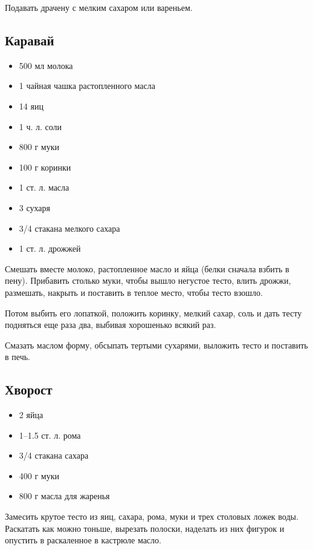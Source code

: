 Подавать драчену с мелким сахаром или вареньем.

\subsection{Каравай}

\begin{itemize}
	\item 500 мл молока 
    \item 1 чайная чашка растопленного масла
    \item 14 яиц 
    \item 1 ч. л. соли 
    \item 800 г муки 
    \item 100 г коринки
    \item 1 ст. л. масла 
    \item 3 сухаря
    \item 3/4 стакана мелкого сахара
    \item 1 ст. л. дрожжей
\end{itemize}

Смешать вместе молоко, растопленное масло и яйца (белки сначала взбить в пену). Прибавить столько муки, чтобы вышло негустое тесто, влить дрожжи, размешать, накрыть и поставить в теплое место, чтобы тесто взошло.

Потом выбить его лопаткой, положить коринку, мелкий сахар, соль и дать тесту подняться еще раза два, выбивая хорошенько всякий раз.

Смазать маслом форму, обсыпать тертыми сухарями, выложить тесто и поставить в печь.

\subsection{Хворост}

\begin{itemize}
	\item 2 яйца 
    \item 1–1.5 ст. л. рома
    \item 3/4 стакана сахара 
    \item 400 г муки
    \item 800 г масла для жаренья
\end{itemize}

Замесить крутое тесто из яиц, сахара, рома, муки и трех столовых ложек воды. Раскатать как можно тоньше, вырезать полоски, наделать из них фигурок и опустить в раскаленное в кастрюле масло.

